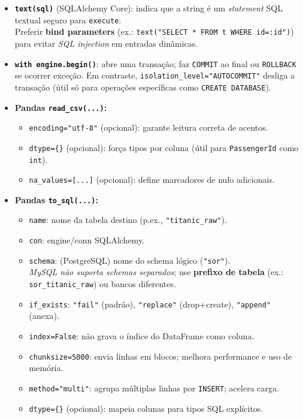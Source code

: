 \documentclass[12pt,a4paper]{article}
\begin{document}
\begin{itemize}
  \item \textbf{\texttt{text(sql)}} (SQLAlchemy Core): indica que a string é um \textit{statement} SQL textual seguro para \texttt{execute}. \\
  Preferir \textbf{bind parameters} (ex.: \texttt{text("SELECT * FROM t WHERE id=:id")}) para evitar \textit{SQL injection} em entradas dinâmicas.

  \item \textbf{\texttt{with engine.begin()}}: abre uma transação; faz \texttt{COMMIT} ao final ou \texttt{ROLLBACK} se ocorrer exceção. Em contraste, \texttt{isolation\_level="AUTOCOMMIT"} desliga a transação (útil só para operações específicas como \texttt{CREATE DATABASE}).

  \item \textbf{Pandas \texttt{read\_csv(...)}:} 
  \begin{itemize}
    \item \texttt{encoding="utf-8"} (opcional): garante leitura correta de acentos.
    \item \texttt{dtype=\{\}} (opcional): força tipos por coluna (útil para \texttt{PassengerId} como \texttt{int}).
    \item \texttt{na\_values=[...]} (opcional): define marcadores de nulo adicionais.
  \end{itemize}

  \item \textbf{Pandas \texttt{to\_sql(...)}:}
  \begin{itemize}
    \item \texttt{name}: nome da tabela destino (p.ex., \texttt{"titanic\_raw"}).
    \item \texttt{con}: engine/conn SQLAlchemy.
    \item \texttt{schema}: (PostgreSQL) nome do schema lógico (\texttt{"sor"}). \\
      \textit{MySQL não suporta schemas separados}; use \textbf{prefixo de tabela} (ex.: \texttt{sor\_titanic\_raw}) ou bancos diferentes.
    \item \texttt{if\_exists}: \texttt{"fail"} (padrão), \texttt{"replace"} (drop+create), \texttt{"append"} (anexa).
    \item \texttt{index=False}: não grava o índice do DataFrame como coluna.
    \item \texttt{chunksize=5000}: envia linhas em blocos; melhora performance e uso de memória.
    \item \texttt{method="multi"}: agrupa múltiplas linhas por \texttt{INSERT}; acelera carga.
    \item \texttt{dtype=\{\}} (opcional): mapeia colunas para tipos SQL explícitos.
  \end{itemize}


\end{itemize}
\end{document}
